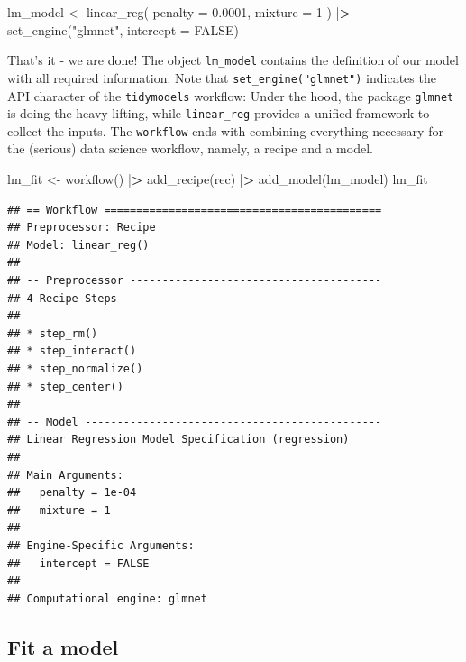 \documentclass[
]{book}
\newenvironment{Shaded}{\begin{snugshade}}{\end{snugshade}}
\newcommand{\AttributeTok}[1]{\textcolor[rgb]{0.61,0.61,0.61}{#1}}
\newcommand{\ConstantTok}[1]{\textcolor[rgb]{0,0,0}{#1}}
\newcommand{\DecValTok}[1]{\textcolor[rgb]{0.06,0.06,0.06}{#1}}
\newcommand{\ErrorTok}[1]{\textcolor[rgb]{0.14,0.14,0.14}{\textbf{#1}}}
\newcommand{\FloatTok}[1]{\textcolor[rgb]{0.06,0.06,0.06}{#1}}
\newcommand{\FunctionTok}[1]{\textcolor[rgb]{0,0,0}{#1}}
\newcommand{\NormalTok}[1]{#1}
\newcommand{\OtherTok}[1]{\textcolor[rgb]{0.37,0.37,0.37}{#1}}
\newcommand{\SpecialCharTok}[1]{\textcolor[rgb]{0,0,0}{#1}}
\newcommand{\StringTok}[1]{\textcolor[rgb]{0.5,0.5,0.5}{#1}}
\begin{document}
\begin{Shaded}
\begin{Highlighting}[]
\NormalTok{lm\_model }\OtherTok{\textless{}{-}} \FunctionTok{linear\_reg}\NormalTok{(}
  \AttributeTok{penalty =} \FloatTok{0.0001}\NormalTok{,}
  \AttributeTok{mixture =} \DecValTok{1}
\NormalTok{) }\SpecialCharTok{|}\ErrorTok{\textgreater{}}
  \FunctionTok{set\_engine}\NormalTok{(}\StringTok{"glmnet"}\NormalTok{, }\AttributeTok{intercept =} \ConstantTok{FALSE}\NormalTok{)}
\end{Highlighting}
\end{Shaded}

That's it - we are done! The object \texttt{lm\_model} contains the definition of our model with all required information. Note that \texttt{set\_engine("glmnet")} indicates the API character of the \texttt{tidymodels} workflow: Under the hood, the package \texttt{glmnet} is doing the heavy lifting, while \texttt{linear\_reg} provides a unified framework to collect the inputs. The \texttt{workflow} ends with combining everything necessary for the (serious) data science workflow, namely, a recipe and a model.

\begin{Shaded}
\begin{Highlighting}[]
\NormalTok{lm\_fit }\OtherTok{\textless{}{-}} \FunctionTok{workflow}\NormalTok{() }\SpecialCharTok{|}\ErrorTok{\textgreater{}}
  \FunctionTok{add\_recipe}\NormalTok{(rec) }\SpecialCharTok{|}\ErrorTok{\textgreater{}}
  \FunctionTok{add\_model}\NormalTok{(lm\_model)}
\NormalTok{lm\_fit}
\end{Highlighting}
\end{Shaded}

\begin{verbatim}
## == Workflow ===========================================
## Preprocessor: Recipe
## Model: linear_reg()
## 
## -- Preprocessor ---------------------------------------
## 4 Recipe Steps
## 
## * step_rm()
## * step_interact()
## * step_normalize()
## * step_center()
## 
## -- Model ----------------------------------------------
## Linear Regression Model Specification (regression)
## 
## Main Arguments:
##   penalty = 1e-04
##   mixture = 1
## 
## Engine-Specific Arguments:
##   intercept = FALSE
## 
## Computational engine: glmnet
\end{verbatim}

\hypertarget{fit-a-model}{%
\subsection{Fit a model}\label{fit-a-model}}
\end{document}
